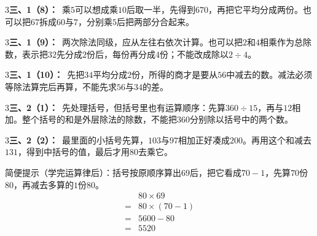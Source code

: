 \documentclass[multi=snippet,border={5bp 20bp 5bp 5bp}]{standalone}
\newenvironment{snippet}[3]{\begin{minipage}{#1bp}\color{answerred}\fontsize{#2}{#3}\selectfont\raggedright}{\end{minipage}}
\begin{document}
\begin{snippet}{505}{11.5}{14}\begin{multicols}{3}\raggedcolumns \textbf{三、1（8）：}\ 乘\(5\)\allowbreak 可以想成乘\(10\)\allowbreak 后取一半，先得到\(670\)\allowbreak ，再把它平均分成两份。也可以把\(67\)\allowbreak 拆成\(60\)\allowbreak 与\(7\)\allowbreak ，分别乘\(5\)\allowbreak 后把两部分合起来。\end{multicols}\end{snippet}
\begin{snippet}{505}{11.5}{14}\begin{multicols}{3}\raggedcolumns \textbf{三、1（9）：}\ 两次除法同级，应从左往右依次计算。也可以把\(2\)\allowbreak 和\(4\)\allowbreak 相乘作为总除数，表示把\(32\)\allowbreak 先分成\(2\)\allowbreak 份后，每份再分成\(4\)\allowbreak 份；不能改成除以\(2\div4\)\allowbreak 。\end{multicols}\end{snippet}
\begin{snippet}{505}{11.5}{14}\begin{multicols}{3}\raggedcolumns \textbf{三、1（10）：}\ 先把\(34\)\allowbreak 平均分成\(2\)\allowbreak 份，所得的商才是要从\(56\)\allowbreak 中减去的数。减法必须等除法算完后再算，不能先求\(56\)\allowbreak 与\(34\)\allowbreak 的差。\end{multicols}\end{snippet}
\begin{snippet}{505}{11.5}{14}\begin{multicols}{3}\raggedcolumns \textbf{三、2（1）：}\ 先处理括号，但括号里也有运算顺序：先算\(360\div15\)\allowbreak ，再与\(12\)\allowbreak 相加。整个括号的和是外层除法的除数，不能把\(360\)\allowbreak 分别除以括号中的两个数。\end{multicols}\end{snippet}
\begin{snippet}{505}{11.5}{14}\begin{multicols}{3}\raggedcolumns \textbf{三、2（2）：}\ 最里面的小括号先算，\(103\)\allowbreak 与\(97\)\allowbreak 相加正好凑成\(200\)\allowbreak 。再用这个和减去\(131\)\allowbreak ，得到中括号的值，最后才用\(80\)\allowbreak 去乘它。\par 简便提示（学完运算律后）：括号按原顺序算出\(69\)\allowbreak 后，把它看成\(70-1\)\allowbreak ，先算\(70\)\allowbreak 份\(80\)\allowbreak ，再减去多算的\(1\)\allowbreak 份\(80\)\allowbreak 。\[\begin{aligned}&80\times69\\={}&80\times(70-1)\\={}&5600-80\\={}&5520\end{aligned}\]\end{multicols}\end{snippet}
\end{document}
